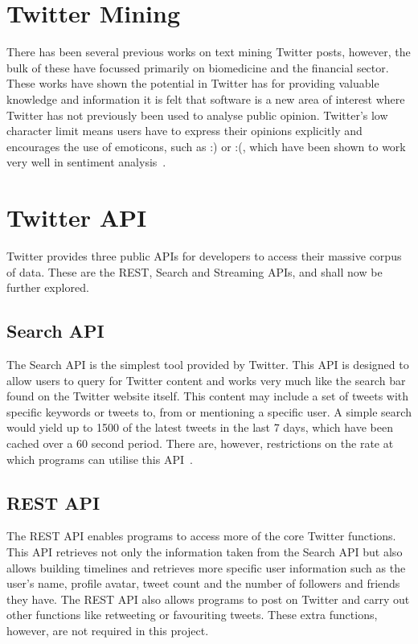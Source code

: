\section{Twitter Mining}
There has been several previous works on text mining Twitter posts, however, the bulk of these have focussed primarily on biomedicine and the financial sector. These works have shown the potential in Twitter has for providing valuable knowledge and information it is felt that software is a new area of interest where Twitter has not previously been used to analyse public opinion. Twitter's low character limit means users have to express their opinions explicitly and encourages the use of emoticons, such as :) or :(, which have been shown to work very well in sentiment analysis~\cite{Read:2005}.


\section{Twitter API}
Twitter provides three public APIs for developers to access their massive corpus of data. These are the REST, Search and Streaming APIs, and shall now be further explored.

\subsection{Search API}
The Search API is the simplest tool provided by Twitter. This API is designed to allow users to query for Twitter content and works very much like the search bar found on the Twitter website itself. This content may include a set of tweets with specific keywords or tweets to, from or mentioning a specific user. A simple search would yield up to 1500 of the latest tweets in the last 7 days, which have been cached over a 60 second period. There are, however, restrictions on the rate at which programs can utilise this API~\cite{twitter}.

\subsection{REST API}
The REST API enables programs to access more of the core Twitter functions. This API retrieves not only the information taken from the Search API but also allows building timelines and retrieves more specific user information such as the user's name, profile avatar, tweet count and the number of followers and friends they have. The REST API also allows programs to post on Twitter and carry out other functions like retweeting or favouriting tweets. These extra functions, however, are not required in this project.

